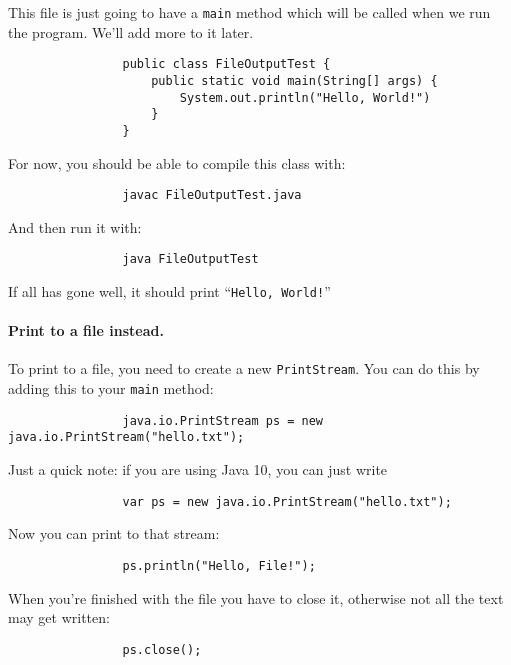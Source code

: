 \documentclass{article}
\begin{document}
            This file is just going to have a \texttt{main} method which will be called when we run the program. We'll add more to it later.
            
            \begin{verbatim}
                public class FileOutputTest {
                    public static void main(String[] args) {
                        System.out.println("Hello, World!")
                    }
                }
            \end{verbatim}
        
            For now, you should be able to compile this class with:
            \begin{verbatim}
                javac FileOutputTest.java
            \end{verbatim}
            
            And then run it with:
            \begin{verbatim}
                java FileOutputTest
            \end{verbatim}
        
            If all has gone well, it should print ``\texttt{Hello, World!}''
            
        \paragraph{Print to a file instead.}
            
            To print to a file, you need to create a new \texttt{PrintStream}. You can do this by adding this to your \texttt{main} method:
            \begin{verbatim}
                java.io.PrintStream ps = new java.io.PrintStream("hello.txt");
            \end{verbatim}
            Just a quick note: if you are using Java 10, you can just write 
            \begin{verbatim}
                var ps = new java.io.PrintStream("hello.txt");
            \end{verbatim}
            
            Now you can print to that stream:
            \begin{verbatim}
                ps.println("Hello, File!");
            \end{verbatim}
            
            When you're finished with the file you have to close it, otherwise not all the text may get written:
            \begin{verbatim}
                ps.close();
            \end{verbatim}
            
\end{document}
